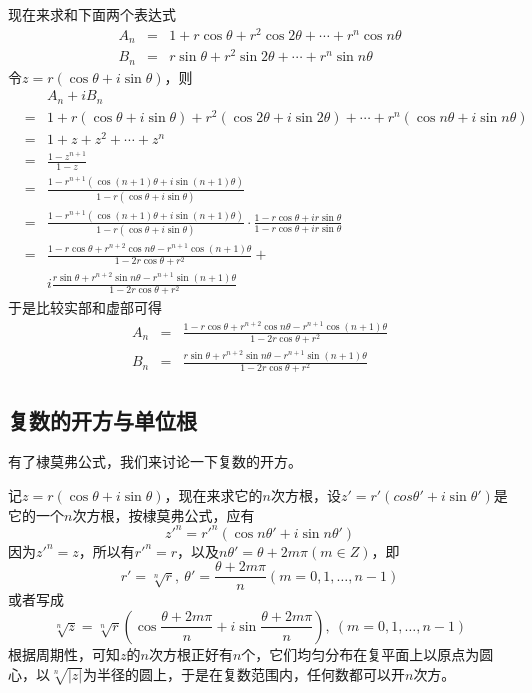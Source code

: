 \begin{example}
  现在来求和下面两个表达式
  \begin{eqnarray*}
    A_n & = & 1 + r\cos{\theta} + r^2\cos{2\theta}+\cdots+r^n\cos{n\theta} \\
    B_n & = & r\sin{\theta} + r^2\sin{2\theta} + \cdots + r^n\sin{n\theta}
  \end{eqnarray*}
  令$z=r(\cos{\theta}+i\sin{\theta})$，则
  \begin{eqnarray*}
   && A_n+iB_n \\ 
   & = & 1 + r(\cos{\theta}+i\sin{\theta})+r^2(\cos{2\theta}+i\sin{2\theta})+\cdots+r^n(\cos{n\theta}+i\sin{n\theta}) \\
   & = & 1+ z + z^2 + \cdots + z^n \\
   & = & \frac{1-z^{n+1}}{1-z} \\
    & = & \frac{1-r^{n+1}(\cos{(n+1)\theta}+i\sin{(n+1)\theta})}{1-r(\cos{\theta}+i\sin{\theta})} \\
       & = & \frac{1-r^{n+1}(\cos{(n+1)\theta}+i\sin{(n+1)\theta})}{1-r(\cos{\theta}+i\sin{\theta})} \cdot \frac{1-r\cos{\theta}+ir\sin{\theta}}{1-r\cos{\theta}+ir\sin{\theta}} \\
   & = & \frac{1-r\cos{\theta}+r^{n+2}\cos{n\theta}-r^{n+1}\cos{(n+1)\theta}}{1-2r\cos{\theta}+r^2} + \\
    && i \frac{r\sin{\theta}+r^{n+2}\sin{n\theta}-r^{n+1}\sin{(n+1)\theta}}{1-2r\cos{\theta}+r^2}
  \end{eqnarray*}
  于是比较实部和虚部可得
  \begin{eqnarray*}
    A_n & = & \frac{1-r\cos{\theta}+r^{n+2}\cos{n\theta}-r^{n+1}\cos{(n+1)\theta}}{1-2r\cos{\theta}+r^2} \\
    B_n & = & \frac{r\sin{\theta}+r^{n+2}\sin{n\theta}-r^{n+1}\sin{(n+1)\theta}}{1-2r\cos{\theta}+r^2}
  \end{eqnarray*}
\end{example}

\subsection{复数的开方与单位根}
\label{sec:n-th-root-of-one}



有了棣莫弗公式，我们来讨论一下复数的开方。

记$z=r(\cos{\theta}+i\sin{\theta})$，现在来求它的$n$次方根，设$z'=r'(cos{\theta'+i\sin{\theta'}})$是它的一个$n$次方根，按棣莫弗公式，应有
\[ z'^n=r'^n(\cos{n\theta'}+i\sin{n\theta'}) \]
因为$z'^n=z$，所以有$r'^n=r$，以及$n\theta'=\theta+2m\pi(m \in Z)$，即
\[ r'=\sqrt[n]{r}, \  \theta'=\frac{\theta+2m\pi}{n}(m=0,1,\ldots,n-1) \]
或者写成
\[ \sqrt[n]{z}=\sqrt[n]{r} \left( \cos{\frac{\theta+2m\pi}{n}}+i\sin{\frac{\theta+2m\pi}{n}} \right), \  (m=0,1,\ldots,n-1) \]
根据周期性，可知$z$的$n$次方根正好有$n$个，它们均匀分布在复平面上以原点为圆心，以$\sqrt[n]{|z|}$为半径的圆上，于是在复数范围内，任何数都可以开$n$次方。


